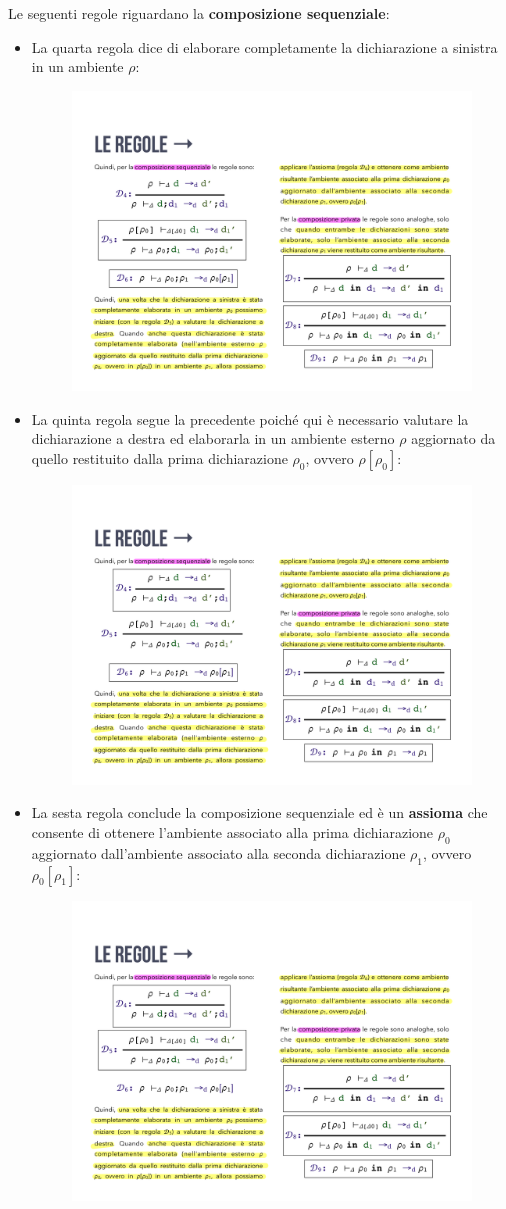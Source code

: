 \documentclass[a4paper]{article}
\begin{document}
	Le seguenti regole riguardano la \textbf{composizione sequenziale}:
	\begin{itemize}
		\item La quarta regola dice di elaborare completamente la dichiarazione a sinistra in un ambiente $\rho$:
		\begin{figure}[!htp]
			\centering
			\includegraphics[width=.4\textwidth]{img/regola_dichiarazione-4.pdf}
		\end{figure}
		
		\item La quinta regola segue la precedente poiché qui è necessario valutare la dichiarazione a destra ed elaborarla in un ambiente esterno $\rho$ aggiornato da quello restituito dalla prima dichiarazione $\rho_{0}$, ovvero $\rho\left[\rho_{0}\right]$:
		\begin{figure}[!htp]
			\centering
			\includegraphics[width=.5\textwidth]{img/regola_dichiarazione-5.pdf}
		\end{figure}\newpage
		
		\item La sesta regola conclude la composizione sequenziale ed è un \textbf{assioma} che consente di ottenere l'ambiente associato alla prima dichiarazione $\rho_{0}$ aggiornato dall'ambiente associato alla seconda dichiarazione $\rho_{1}$, ovvero $\rho_{0}\left[\rho_{1}\right]$:
		\begin{figure}[!htp]
			\centering
			\includegraphics[width=.5\textwidth]{img/regola_dichiarazione-6.pdf}
		\end{figure}
	\end{itemize}
\end{document}
